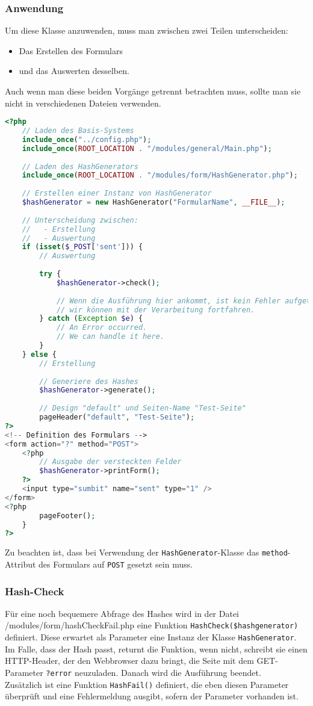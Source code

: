 \subsubsection{Anwendung}
Um diese Klasse anzuwenden, muss man zwischen zwei Teilen unterscheiden:
\begin{itemize}
	\item Das Erstellen des Formulars
	\item und das Auswerten desselben.
\end{itemize}
Auch wenn man diese beiden Vorgänge getrennt betrachten muss, sollte man sie nicht in verschiedenen Dateien verwenden.\\
\begin{lstlisting}[style=custom, language=php, caption={Anwendung von \texttt{HashGenerator}},label={lst:content_imple_hash_example}]
<?php
	// Laden des Basis-Systems
	include_once("../config.php");
	include_once(ROOT_LOCATION . "/modules/general/Main.php");
	
	// Laden des HashGenerators
	include_once(ROOT_LOCATION . "/modules/form/HashGenerator.php");
	
	// Erstellen einer Instanz von HashGenerator
	$hashGenerator = new HashGenerator("FormularName", __FILE__);
	
	// Unterscheidung zwischen:
	//   - Erstellung
	//   - Auswertung
	if (isset($_POST['sent'])) {
		// Auswertung
		
		try {
			$hashGenerator->check();
			
			// Wenn die Ausführung hier ankommt, ist kein Fehler aufgetreten,
			// wir können mit der Verarbeitung fortfahren.
		} catch (Exception $e) {
			// An Error occurred.
			// We can handle it here.
		}
	} else {
		// Erstellung
		
		// Generiere des Hashes
		$hashGenerator->generate();
		
		// Design "default" und Seiten-Name "Test-Seite"
		pageHeader("default", "Test-Seite");
?>
<!-- Definition des Formulars -->
<form action="?" method="POST">
	<?php
		// Ausgabe der versteckten Felder
		$hashGenerator->printForm();
	?>
	<input type="sumbit" name="sent" type="1" />
</form>
<?php
		pageFooter();
	}
?>
\end{lstlisting}
Zu beachten ist, dass bei Verwendung der \texttt{HashGenerator}-Klasse das \texttt{method}-Attribut des Formulars auf \texttt{POST} gesetzt sein muss.

\subsubsection{Hash-Check}
Für eine noch bequemere Abfrage des Hashes wird in der Datei /modules/form/hashCheckFail.php eine Funktion \texttt{HashCheck(\$hashgenerator)} definiert. Diese erwartet als Parameter eine Instanz der Klasse \texttt{HashGenerator}. Im Falle, dass der Hash passt, returnt die Funktion, wenn nicht, schreibt sie einen HTTP-Header, der den Webbrowser dazu bringt, die Seite mit dem GET-Parameter \texttt{?error} neuzuladen. Danach wird die Ausführung beendet.\\
Zusätzlich ist eine Funktion \texttt{HashFail()} definiert, die eben diesen Parameter überprüft und eine Fehlermeldung ausgibt, sofern der Parameter vorhanden ist.